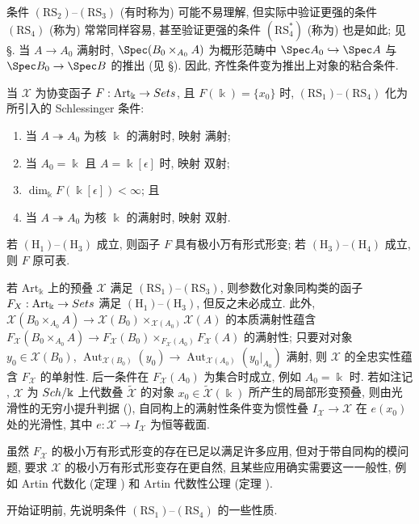 条件 $(\mathrm{RS}_2)$--$(\mathrm{RS}_3)$ (有时称为) 可能不易理解, 但实际中验证更强的条件 $(\mathrm{RS}_4)$ (称为) 常常同样容易, 甚至验证更强的条件 $(\mathrm{RS}_4^*)$ (称为) 也是如此; 见 \S{}. 当 $A\to A_0$ 满射时, $\Spec(B_0\times_{A_0}A)$ 为概形范畴中 $\Spec A_0\hookrightarrow\Spec A$ 与 $\Spec B_0\to\Spec B$ 的推出 (见 \S{}). 因此, 齐性条件变为推出上对象的粘合条件.
\begin{remark}\label{src:C.4.8}
当 $\mathcal X$ 为协变函子 $F:\mathrm{Art}_{\Bbbk}\to Sets$, 且 $F(\Bbbk)=\{x_0\}$ 时, $(\mathrm{RS}_1)$--$(\mathrm{RS}_4)$ 化为 \cite{Sch68} 所引入的 Schlessinger 条件:
\begin{enumerate}[$(\mathrm H_1)$]
\item 当 $A\twoheadrightarrow A_0$ 为核 $\Bbbk$ 的满射时, 映射  满射;
\item 当 $A_0=\Bbbk$ 且 $A=\Bbbk[\epsilon]$ 时, 映射  双射;
\item $\dim_{\Bbbk}F(\Bbbk[\epsilon])<\infty$; 且
\item 当 $A\twoheadrightarrow A_0$ 为核 $\Bbbk$ 的满射时, 映射  双射.
\end{enumerate}
若 $(\mathrm H_1)$--$(\mathrm H_3)$ 成立, 则函子 $F$ 具有极小万有形式形变; 若 $(\mathrm H_3)$--$(\mathrm H_4)$ 成立, 则 $F$ 原可表.

若 $\mathrm{Art}_{\Bbbk}$ 上的预叠 $\mathcal X$ 满足 $(\mathrm{RS}_1)$--$(\mathrm{RS}_3)$, 则参数化对象同构类的函子 $F_{X}:\mathrm{Art}_{\Bbbk}\to Sets$ 满足 $(\mathrm H_1)$--$(\mathrm H_3)$, 但反之未必成立. 此外, $\mathcal X(B_0\times_{A_0}A)\to\mathcal X(B_0)\times_{\mathcal X(A_0)}\mathcal X(A)$ 的本质满射性蕴含 $F_{\mathcal X}(B_0\times_{A_0}A)\to F_{\mathcal X}(B_0)\times_{F_{\mathcal X}(A_0)}F_{\mathcal X}(A)$ 的满射性; 只要对对象 $y_0\in\mathcal X(B_0)$, $\operatorname{Aut}_{\mathcal X(B_0)}(y_0)\to\operatorname{Aut}_{\mathcal X(A_0)}(y_0|_{A_0})$ 满射, 则 $\mathcal X$ 的全忠实性蕴含 $F_{\mathcal X}$ 的单射性. 后一条件在 $F_{\mathcal X}(A_0)$ 为集合时成立, 例如 $A_0=\Bbbk$ 时. 若如注记 , $\mathcal X$ 为 $Sch/\Bbbk$ 上代数叠 $\widetilde{\mathcal X}$ 的对象 $x_0\in\widetilde{\mathcal X}(\Bbbk)$ 所产生的局部形变预叠, 则由光滑性的无穷小提升判据 (), 自同构上的满射性条件变为惯性叠 $I_{\mathcal X}\to\mathcal X$ 在 $e(x_0)$ 处的光滑性, 其中 $e:\mathcal X\to I_{\mathcal X}$ 为恒等截面.

虽然 $F_{\mathcal X}$ 的极小万有形式形变的存在已足以满足许多应用, 但对于带自同构的模问题, 要求 $\mathcal X$ 的极小万有形式形变存在更自然, 且某些应用确实需要这一一般性, 例如 Artin 代数化 (定理 ) 和 Artin 代数性公理 (定理 ).
\end{remark}
开始证明前, 先说明条件 $(\mathrm{RS}_1)$--$(\mathrm{RS}_4)$ 的一些性质.
